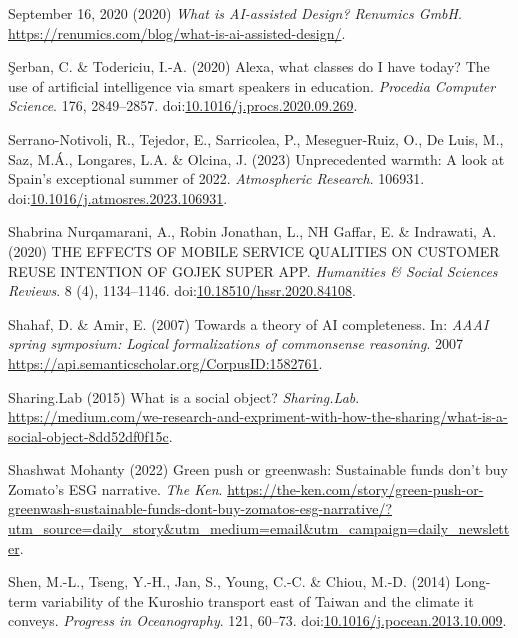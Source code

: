\documentclass[
  letterpaper,
  DIV=11,
  numbers=noendperiod]{scrartcl}
\newlength{\cslhangindent}
\newenvironment{CSLReferences}[2] %
 {\begin{list}{}{%
  \setlength{\itemindent}{0pt}
  \setlength{\leftmargin}{0pt}
  \setlength{\parsep}{0pt}
  \ifodd #1
   \setlength{\leftmargin}{\cslhangindent}
   \setlength{\itemindent}{-1\cslhangindent}
  \fi
  \setlength{\itemsep}{#2\baselineskip}}}
 {\end{list}}
\begin{document}
\begin{CSLReferences}{0}{1}
September 16, 2020 (2020) \emph{What is {AI-assisted Design}? {\textbar}
{Renumics GmbH}}.
\url{https://renumics.com/blog/what-is-ai-assisted-design/}.

Şerban, C. \& Todericiu, I.-A. (2020) Alexa, what classes do {I} have
today? {The} use of artificial intelligence via smart speakers in
education. \emph{Procedia Computer Science}. 176, 2849--2857.
doi:\href{https://doi.org/10.1016/j.procs.2020.09.269}{10.1016/j.procs.2020.09.269}.

Serrano-Notivoli, R., Tejedor, E., Sarricolea, P., Meseguer-Ruiz, O., De
Luis, M., Saz, M.Á., Longares, L.A. \& Olcina, J. (2023) Unprecedented
warmth: {A} look at {Spain}'s exceptional summer of 2022.
\emph{Atmospheric Research}. 106931.
doi:\href{https://doi.org/10.1016/j.atmosres.2023.106931}{10.1016/j.atmosres.2023.106931}.

Shabrina Nurqamarani, A., Robin Jonathan, L., NH Gaffar, E. \&
Indrawati, A. (2020) {THE EFFECTS OF MOBILE SERVICE QUALITIES ON
CUSTOMER REUSE INTENTION OF GOJEK SUPER APP}. \emph{Humanities \& Social
Sciences Reviews}. 8 (4), 1134--1146.
doi:\href{https://doi.org/10.18510/hssr.2020.84108}{10.18510/hssr.2020.84108}.

Shahaf, D. \& Amir, E. (2007) Towards a theory of {AI} completeness. In:
\emph{{AAAI} spring symposium: {Logical} formalizations of commonsense
reasoning}. 2007 \url{https://api.semanticscholar.org/CorpusID:1582761}.

Sharing.Lab (2015) What is a social object? \emph{Sharing.Lab}.
\url{https://medium.com/we-research-and-expriment-with-how-the-sharing/what-is-a-social-object-8dd52df0f15c}.

Shashwat Mohanty (2022) Green push or greenwash: Sustainable funds don't
buy {Zomato}'s {ESG} narrative. \emph{The Ken}.
\url{https://the-ken.com/story/green-push-or-greenwash-sustainable-funds-dont-buy-zomatos-esg-narrative/?utm_source=daily_story&utm_medium=email&utm_campaign=daily_newsletter}.

Shen, M.-L., Tseng, Y.-H., Jan, S., Young, C.-C. \& Chiou, M.-D. (2014)
Long-term variability of the {Kuroshio} transport east of {Taiwan} and
the climate it conveys. \emph{Progress in Oceanography}. 121, 60--73.
doi:\href{https://doi.org/10.1016/j.pocean.2013.10.009}{10.1016/j.pocean.2013.10.009}.


\end{CSLReferences}
\end{document}
